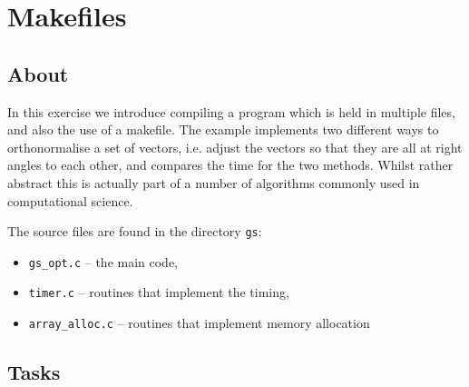 \documentclass[a4paper, 12pt]{article}
\def \cc   {\tt }               %
\begin{document}

\section{Makefiles}
\label{integral}


\subsection*{About}

In this exercise we introduce compiling a program which is held in multiple files, and also the
use of a makefile. The example implements two different ways to orthonormalise a set of vectors,
i.e. adjust the vectors so that they are all at right angles to each other, and compares the time
for the two methods. Whilst rather abstract this is actually part of a number of algorithms commonly
used in computational science.

The source files are found in the directory {\cc gs}:
%
\begin{itemize}
  \item {\cc gs\_opt.c} -- the main code,
  \item {\cc timer.c} -- routines that implement the timing,
  \item {\cc array\_alloc.c} -- routines that implement memory allocation
\end{itemize}
%

\subsection*{Tasks}
\end{document}
